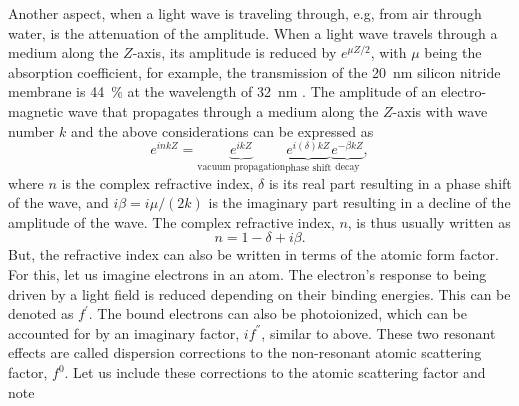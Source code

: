 Another aspect, when a light wave is traveling through, e.g, from air through water, is the attenuation of the amplitude. When a light wave travels through a medium along the $Z$-axis, its amplitude is reduced by $e^{\mu Z/2}$, with $\mu$ being the absorption coefficient, for example, the transmission of the \SI{20}{\nano\meter} silicon nitride membrane is \SI{44}{\percent} at the wavelength of \SI{32}{\nano\meter} \cite{Chapman-2006-NatPhys}.
The amplitude of an electro-magnetic wave that propagates through a medium along the $Z$-axis with wave number $k$ and the above considerations can be expressed as \citep{Attwood-2007-CUP}
\begin{equation}
e^{i n k Z}= \underbrace{e^{i k Z}}_{\text{vacuum propagation}} \underbrace{e^{i \left(\delta\right)k Z}}_{\text{phase shift}} \underbrace{e^{-\beta k Z}}_{\text{decay}},
\label{eq:wave-in-medium}
\end{equation}
where $n$ is the complex refractive index, $\delta$ is its real part resulting in a phase shift of the wave, and $i \beta=i \mu/(2 k)$ is the imaginary part resulting in a decline of the amplitude of the wave. The complex refractive index, $n$, is thus usually written as
\begin{equation}
n=1-\delta+i\beta.
\label{eq:complex-refractive-index}
\end{equation}
But, the refractive index can also be written in terms of the atomic form factor. For this, let us imagine electrons in an atom. The electron's response to being driven by a light field is reduced depending on their binding energies. This can be denoted as $f^{'}$. The bound electrons can also be photoionized, which can be accounted for by an imaginary factor, $i f^{''}$, similar to above. These two resonant effects are called dispersion corrections to the non-resonant atomic scattering factor, $f^{0}$. Let us include these corrections to the atomic scattering factor and note

